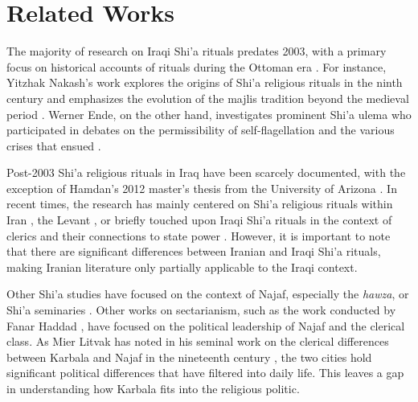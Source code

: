 
\section{Related Works}
The majority of research on Iraqi Shi'a rituals predates 2003, with a primary focus on historical accounts of rituals during the Ottoman era \cite{nakash_shiis_1994} \cite{brunner_twelver_2001} \cite{ayoub_redemptive_1978}. For instance, Yitzhak Nakash's work explores the origins of Shi'a religious rituals in the ninth century and emphasizes the evolution of the majlis tradition beyond the medieval period \cite[164]{yitzhak_nakash_attempt_1993}. Werner Ende, on the other hand, investigates prominent Shi'a ulema who participated in debates on the permissibility of self-flagellation and the various crises that ensued \cite{ende_flagellations_1978}. 

Post-2003 Shi'a religious rituals in Iraq have been scarcely documented, with the exception of Hamdan's 2012 master's thesis from the University of Arizona \cite{hamdan_development_2012}. In recent times, the research has mainly centered on Shi'a religious rituals within Iran \cite{dabashi_taziyeh_2005} \cite{aghaie_martyrs_2004} \cite{flaskerud_visualizing_2012} \cite{saramifar_circling_2020}, the Levant \cite{weiss_shadow_2010} \cite{szanto_beyond_2013}, or briefly touched upon Iraqi Shi'a rituals in the context of clerics and their connections to state power \cite{nakash_reaching_2006} \cite{davis_memories_2005} \cite{cole_ayatollahs_2006}. However, it is important to note that there are significant differences between Iranian and Iraqi Shi'a rituals, making Iranian literature only partially applicable to the Iraqi context.

Other Shi'a studies have focused on the context of Najaf, especially the \emph{hawza}, or Shi'a seminaries \cite{kassem_modernization_2018} \cite{mottahedeh_najaf_2016}. Other works on sectarianism, such as the work conducted by Fanar Haddad \cite{haddad_understanding_2020}, have focused on the political leadership of Najaf and the clerical class. As Mier Litvak has noted in his seminal work on the clerical differences between Karbala and Najaf in the nineteenth century \cite{litvak_shii_2002}, the two cities hold significant political differences that have filtered into daily life. This leaves a gap in understanding how Karbala fits into the religious politic. 

